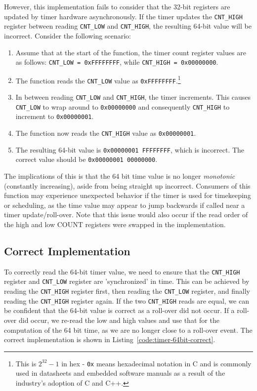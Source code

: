 \documentclass[main.tex]{subfiles}
\begin{document}
\noindent However, this implementation fails to consider that the 32-bit registers are updated by timer hardware asynchronously. If the timer updates the \texttt{CNT\_HIGH} register between reading \texttt{CNT\_LOW} and \texttt{CNT\_HIGH}, the resulting 64-bit value will be incorrect. Consider the following scenario:
\begin{enumerate}
    \item Assume that at the start of the function, the timer count register values are as follows: \texttt{CNT\_LOW = 0xFFFFFFFF}, while \texttt{CNT\_HIGH = 0x00000000}.
    \item The function reads the \texttt{CNT\_LOW} value as \texttt{0xFFFFFFFF}.\footnote{This is $2^{32}-1$ in hex - \texttt{0x} means hexadecimal notation in C and is commonly used in datasheets and embedded software manuals as a result of the industry's adoption of C and C++.}
    \item In between reading \texttt{CNT\_LOW} and \texttt{CNT\_HIGH}, the timer increments. This causes \texttt{CNT\_LOW} to wrap around to \texttt{0x00000000} and consequently \texttt{CNT\_HIGH} to increment to \texttt{0x00000001}.
    \item The function now reads the \texttt{CNT\_HIGH} value as \texttt{0x00000001}.
    \item The resulting 64-bit value is \texttt{0x00000001 FFFFFFFF}, which is incorrect. The correct value should be \texttt{0x00000001 00000000}.
\end{enumerate}

\noindent The implications of this is that the 64 bit time value is no longer \textit{monotonic} (constantly increasing), aside from being straight up incorrect. Consumers of this function may experience unexpected behavior if the timer is used for timekeeping or scheduling, as the time value may appear to jump backwards if called near a timer update/roll-over. Note that this issue would also occur if the read order of the high and low COUNT registers were swapped in the implementation.

\subsection{Correct Implementation}
To correctly read the 64-bit timer value, we need to ensure that the \texttt{CNT\_HIGH} register and \texttt{CNT\_LOW} register are 'synchronized' in time. This can be achieved by reading the \texttt{CNT\_HIGH} register first, then reading the \texttt{CNT\_LOW} register, and finally reading the \texttt{CNT\_HIGH} register again. If the two \texttt{CNT\_HIGH} reads are equal, we can be confident that the 64-bit value is correct as a roll-over did not occur. If a roll-over did occur, we re-read the low and high values and use that for the computation of the 64 bit time, as we are no longer close to a roll-over event. The correct implementation is shown in Listing~\ref{code:timer-64bit-correct}.


\end{document}
